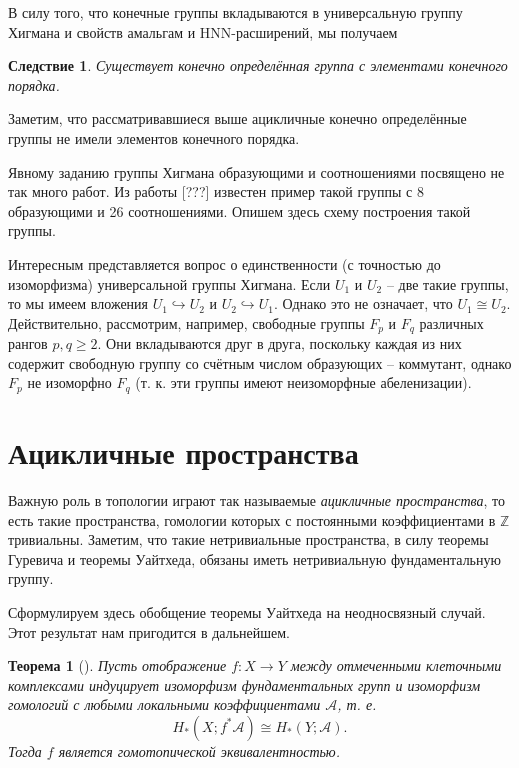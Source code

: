 \documentclass[14pt, dvipsnames]{extarticle}
\newtheorem{theorem}{Теорема}
\newtheorem{corollary}{Следствие}[theorem]
\theoremstyle{definition}
\theoremstyle{remark}
\begin{document}
В силу того, что конечные группы вкладываются в универсальную группу Хигмана и свойств амальгам и HNN-расширений, мы получаем 

\begin{corollary}
Существует конечно определённая группа с элементами конечного порядка.
\end{corollary}

Заметим, что рассматривавшиеся выше ацикличные конечно определённые группы не имели элементов конечного порядка. 

Явному заданию группы Хигмана образующими и соотношениями посвящено не так много работ.  Из работы [???] известен пример такой группы с 8 образующими и 26 соотношениями. Опишем здесь схему построения такой группы.

Интересным представляется вопрос о единственности (с точностью до изоморфизма) универсальной группы Хигмана. Если $U_1$ и $U_2$ -- две такие группы, то мы имеем вложения $U_1\hookrightarrow U_2$ и $U_2\hookrightarrow U_1$. Однако это не означает, что $U_1\cong U_2$. Действительно, рассмотрим, например, свободные группы  $F_p$ и $F_q$ различных рангов $p, q\geqslant 2$. Они вкладываются друг в друга, поскольку каждая из них содержит свободную группу со счётным числом образующих -- коммутант, однако $F_p$ не изоморфно $F_q$ (т. к. эти группы имеют неизоморфные абеленизации). 
 













\section{Ацикличные пространства}


Важную роль в топологии играют так называемые {\it ацикличные пространства}, то есть такие пространства, гомологии которых с постоянными коэффициентами в $\mathbb{Z}$ тривиальны. Заметим, что такие нетривиальные пространства, в силу теоремы Гуревича и теоремы Уайтхеда, обязаны иметь нетривиальную фундаментальную группу.

Сформулируем здесь обобщение теоремы Уайтхеда на неодносвязный случай. Этот результат нам пригодится в дальнейшем.

\begin{theorem}[\cite{QuillenHomAlg}]\label{WhiteheadNonSimplyConnected}
Пусть отображение $f: X\to Y$ между отмеченными клеточными комплексами индуцирует изоморфизм фундаментальных групп и изоморфизм гомологий с любыми локальными коэффициентами $\mathcal{A}$, т. е. $$H_\ast(X; f^\ast\mathcal{A})\cong H_\ast(Y; \mathcal{A}).$$ Тогда $f$ является гомотопической эквивалентностью.
\end{theorem}  
\end{document}
